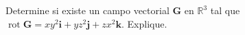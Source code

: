 \item Determine si existe un campo vectorial $\mathbf{G}$ en $\mathbb{R}^3$ tal que $\operatorname{rot} \mathbf{G} = xy^2\mathbf{i} + yz^2\mathbf{j} + zx^2\mathbf{k}$. Explique.
